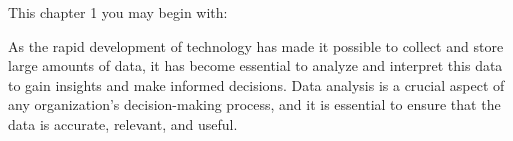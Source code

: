 \thesischapterexordium

This chapter 1 you may begin with:

As the rapid development of technology has made it possible to collect and store large amounts of data, it has become essential to analyze and interpret this data to gain insights and make informed decisions. Data analysis is a crucial aspect of any organization's decision-making process, and it is essential to ensure that the data is accurate, relevant, and useful.
